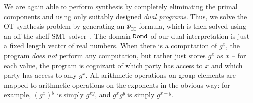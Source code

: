 \documentclass[preprint]{sig-alternate-05-2015}
\def\sender{{\tt{Sender}}}
\def\chooser{{\tt{Chooser}}}
\def\domd{{\tt{Domd}}}
\begin{document}

We are again able to perform synthesis 
by completely eliminating the primal components
and using only suitably designed %
{\em{dual programs}}.
Thus, we solve the OT synthesis problem by generating 
an $\Phi_{\exists\exists}$ formula, which is then solved using an
off-the-shelf SMT solver~\cite{yices,z3}.
%
The domain $\domd$ of our dual interpretation is just a fixed length
vector of real numbers. 
When there is a computation of $g^x$, the program {\em{does not}} perform any computation,
but rather just stores $g^x$ as $x$ -- for each value, the program is cognizant of
which party has access to $x$ and which party has access to only $g^x$.
All arithmetic operations on group elements are mapped to arithmetic operations
on the exponents in the obvious way: for example, $(g^x)^y$ is simply $g^{xy}$,
and $g^xg^y$ is simply $g^{x+y}$. 

\end{document}
